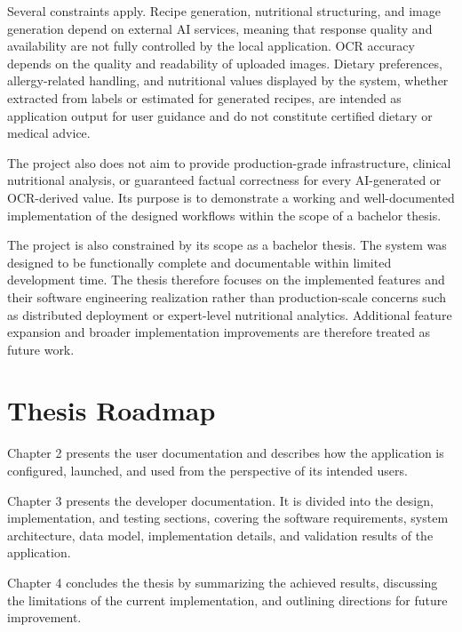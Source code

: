 Several constraints apply. Recipe generation, nutritional structuring, and
image generation depend on external AI services, meaning that response
quality and availability are not fully controlled by the local application.
OCR accuracy depends on the quality and readability of uploaded images.
Dietary preferences, allergy-related handling, and nutritional values
displayed by the system, whether extracted from labels or estimated for
generated recipes, are intended as application output for user guidance and
do not constitute certified dietary or medical advice.

The project also does not aim to provide production-grade infrastructure,
clinical nutritional analysis, or guaranteed factual correctness for every
AI-generated or OCR-derived value. Its purpose is to demonstrate a working
and well-documented implementation of the designed workflows within the
scope of a bachelor thesis.

The project is also constrained by its scope as a bachelor thesis. The
system was designed to be functionally complete and documentable within
limited development time. The thesis therefore focuses on the implemented
features and their software engineering realization rather than
production-scale concerns such as distributed deployment or expert-level
nutritional analytics. Additional feature expansion and broader
implementation improvements are therefore treated as future work.

\section{Thesis Roadmap}

Chapter 2 presents the user documentation and describes how the application
is configured, launched, and used from the perspective of its intended users.

Chapter 3 presents the developer documentation. It is divided into the
design, implementation, and testing sections, covering the software
requirements, system architecture, data model, implementation details,
and validation results of the application.

Chapter 4 concludes the thesis by summarizing the achieved results,
discussing the limitations of the current implementation, and outlining
directions for future improvement.
